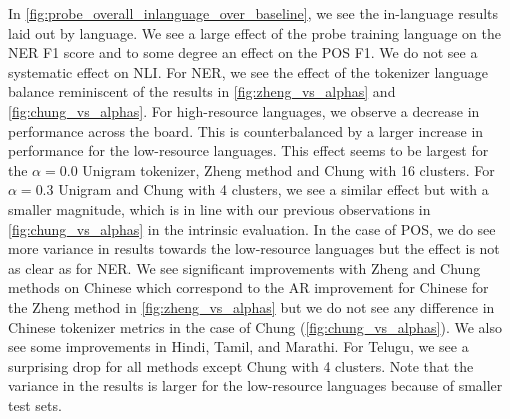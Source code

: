 In \autoref{fig:probe_overall_inlanguage_over_baseline}, we see the in-language results laid out by language. We see a large effect of the probe training language on the NER F1 score and to some degree an effect on the POS F1. We do not see a systematic effect on NLI. For NER, we see the effect of the tokenizer language balance reminiscent of the results in \autoref{fig:zheng_vs_alphas} and \autoref{fig:chung_vs_alphas}. For high-resource languages, we observe a decrease in performance across the board. This is counterbalanced by a larger increase in performance for the low-resource languages. This effect seems to be largest for the $\alpha=0.0$ Unigram tokenizer, Zheng method and Chung with 16 clusters. For $\alpha=0.3$ Unigram and Chung with 4 clusters, we see a similar effect but with a smaller magnitude, which is in line with our previous observations in \autoref{fig:chung_vs_alphas} in the intrinsic evaluation. In the case of POS, we do see more variance in results towards the low-resource languages but the effect is not as clear as for NER. We see significant improvements with Zheng and Chung methods on Chinese which correspond to the AR improvement for Chinese for the Zheng method in \autoref{fig:zheng_vs_alphas} but we do not see any difference in Chinese tokenizer metrics in the case of Chung (\autoref{fig:chung_vs_alphas}). We also see some improvements in Hindi, Tamil, and Marathi. For Telugu, we see a surprising drop for all methods except Chung with 4 clusters. Note that the variance in the results is larger for the low-resource languages because of smaller test sets.


